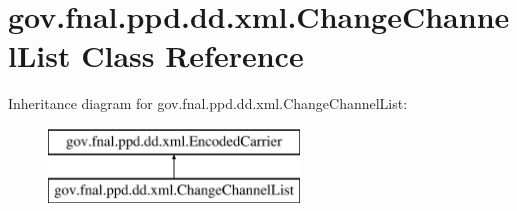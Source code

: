 \hypertarget{classgov_1_1fnal_1_1ppd_1_1dd_1_1xml_1_1ChangeChannelList}{\section{gov.\-fnal.\-ppd.\-dd.\-xml.\-Change\-Channel\-List Class Reference}
\label{classgov_1_1fnal_1_1ppd_1_1dd_1_1xml_1_1ChangeChannelList}
}
Inheritance diagram for gov.\-fnal.\-ppd.\-dd.\-xml.\-Change\-Channel\-List\-:\begin{figure}[H]
\begin{center}
\leavevmode
\includegraphics[height=2.000000cm]{classgov_1_1fnal_1_1ppd_1_1dd_1_1xml_1_1ChangeChannelList}
\end{center}
\end{figure}
